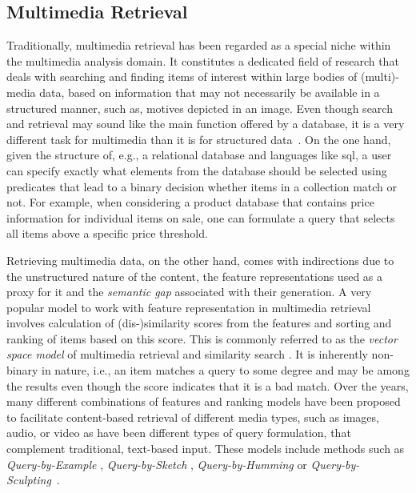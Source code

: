 \subsection{Multimedia Retrieval}

Traditionally, multimedia retrieval has been regarded as a special niche within the  multimedia analysis domain. It constitutes a dedicated field of research that deals with searching and finding items of interest within large bodies of (multi)-media data, based on information that may not necessarily be available in a structured manner, such as, motives depicted in an image. Even though search and retrieval may sound like the main function offered by a database, it is a very different task for multimedia than it is for structured data~\cite{Blanken:2007multimedia}. On the one hand, given the structure of, e.g., a relational database and languages like \acrshort{sql}, a user can specify exactly what elements from the database should be selected using predicates that lead to a binary decision whether items in a collection match or not. For example, when considering a product database that contains price information for individual items on sale, one can formulate a query that selects all items above a specific price threshold.

Retrieving multimedia data, on the other hand, comes with indirections due to the unstructured nature of the content, the feature representations used as a proxy for it and the \emph{semantic gap} \cite{Smeulders:2000Content, Blanken:2007multimedia} associated with their generation. A very popular model to work with feature representation in multimedia retrieval involves calculation of (dis-)similarity scores from the features and sorting and ranking of items based on this score. This is commonly referred to as the \emph{vector space model} of multimedia retrieval and similarity search \cite{Zezula:2006Similarity}. It is inherently non-binary in nature, i.e., an item matches a query to some degree and may be among the results even though the score indicates that it is a bad match. Over the years, many different combinations of features and ranking models have been proposed to facilitate content-based retrieval of different media types, such as images, audio, or video \cite{Hu:2011Survey,Dharani:2013Survey,Murthy:2018Content} as have been different types of query formulation, that complement traditional, text-based input. These models include methods such as \emph{Query-by-Example} \cite{Kelly:1995Query}, \emph{Query-by-Sketch} \cite{Sciascio:1999Content}, \emph{Query-by-Humming} \cite{Ghias:1995query} or \emph{Query-by-Sculpting}~\cite{Boerlin:20203d}.


